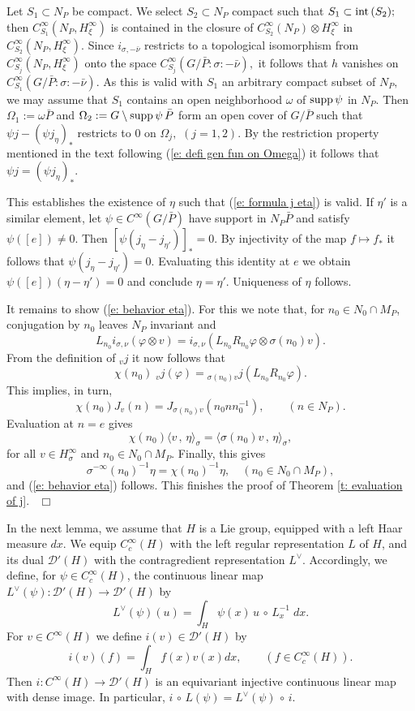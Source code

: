 \documentclass[12pt,a4paper]{article}
\def\qed{~\hfill\hbox{$\Box$}\medbreak}
\def\qquad{\quad\quad}
\def\gf{\varphi}
\def\gs{\sigma}
\def\to{\rightarrow}
\def\inp#1#2{\langle#1\,,\,#2\rangle}
\def\after{\,{\scriptstyle\circ}\,}
\def\cD{{\mathcal D}}
\numberwithin{Thm}{section}
\numberwithin{equation}{section}
\def\supp{{\rm supp}}
\numberwithin{equation}{section}
\def\jv{{}_vj}
\def\cchi{\chi}
\def\veec{\vee}%
\begin{document}
Let $S_1\subset N_P$ be compact. We select $ S_2 \subset N_P$ compact such that $S_1 \subset {\rm int}\,(S_2);$ 
then $C^\infty_{S_1}(N_P, H_\xi^\infty)$ is contained in the closure of 
$C^\infty_{S_2}(N_P) \otimes H_\xi^\infty$ in $C^\infty_{S_2}(N_P, H_\xi^\infty).$
Since $i_{\gs, -\bar \nu}$ restricts to a topological isomorphism 
from $C^\infty_{S_j}(N_P, H_\xi^\infty)$ onto the space $C^\infty_{S_j}(G/\bar P: \gs :-\bar \nu),$ 
it follows that $h$ vanishes on $C^\infty_{S_1}(G/\bar P: \gs :-\bar \nu).$ As this is valid
with  $S_1$ an arbitrary compact subset of $N_P,$ we may assume that $S_1$ contains
an open neighborhood $\omega$ of $\supp \,\psi$ in $N_P.$ Then $\Omega_1:= \omega \bar P$ 
and $\Omega_2:= G \setminus \supp \,\psi \,\bar P$ form an open cover of $G/\bar P$ 
such that $\psi j - (\psi j_\eta)_*$ restricts to $0$ on $\Omega_j,$ $(j=1,2).$ By the restriction 
property mentioned in the text following (\ref{e: defi gen fun on Omega}) it follows that 
$\psi j = (\psi j_\eta)_*.$ 

This establishes the existence of $\eta$ such that (\ref{e: formula j eta}) is valid.
If $\eta'$ is a similar element, let $\psi\in C^\infty(G/\bar P)$ have support in $N_P \bar P$ 
and satisfy $\psi([e])\neq 0.$ Then $[\psi (j_\eta -j_{\eta'})]_* = 0.$ By injectivity of the map $f \mapsto f_*$ 
it follows that $\psi (j_\eta - j_{\eta'}) = 0.$ Evaluating this identity at $e$ 
we obtain $\psi([e]) (\eta - \eta') =0$ and conclude $\eta = \eta'.$ 
Uniqueness of $\eta$ follows.

It remains to show (\ref{e: behavior eta}). For this we note that,
for $n_0 \in N_0\cap M_P$, conjugation by $n_0$ 
leaves $N_P$ invariant and 
$$ 
L_{n_0} i_{\gs,\nu}(\gf \otimes v) = i_{\gs,\nu} (L_{n_0} R_{n_0} \gf \otimes \gs(n_0) v).
$$%
From the definition of $\jv$ it now follows that
$$ 
\cchi(n_0) \;\jv (\gf) = {}_{\gs(n_0)v}j (L_{n_0} R_{n_0} \gf).
$$%
This implies, in turn,
$$ 
 \cchi(n_0) J_{ v} (n) = J_{\gs(n_0)v} (n_0 n n_0^{-1}), \qquad (n \in N_P).
$$%
Evaluation at $n =e$ gives
$$ 
\cchi(n_0)\inp{v}{\eta}_\gs = \inp{\gs(n_0) v}{\eta}_\gs,
$$%
for all $v \in H_\gs^\infty$ and $n_0 \in N_0\cap M_P.$ 
Finally, this gives 
$$
\gs^{-\infty}(n_0)^{-1}\eta = \cchi(n_0)^{-1} \eta, \quad (n_0 \in N_0 \cap M_P),
$$%
and (\ref{e: behavior eta}) follows. This finishes the proof of Theorem
\ref{t: evaluation of j}.
\qed

In the next lemma, we assume that $H$ is a Lie group, equipped
with a left Haar measure $dx.$ We equip $C^\infty_c(H)$ with the left
regular representation $L$ of $H$, and its dual $\cD'(H)$ with the 
contragredient representation $L^\veec.$ Accordingly, we define, for $\psi \in C_c^\infty(H)$, 
the continuous linear map $L^\veec(\psi): \cD'(H) \to \cD'(H)$ by
$$ 
L^\veec( \psi) (u) = \int_H \psi(x)\, u\after L_x^{-1}\; dx.
$$%
For $v \in C^\infty(H)$ we define $i(v) \in \cD'(H)$ by 
$$ 
i(v)(f) = \int_H f(x) v(x)  dx, \qquad (f \in C^\infty_c(H)).
$$%
Then $i: C^\infty(H) \to \cD'(H)$ is an equivariant injective continuous linear map with dense image.
In particular,  $i \after L(\psi) = L^\veec(\psi)\after i.$ 
\end{document}
